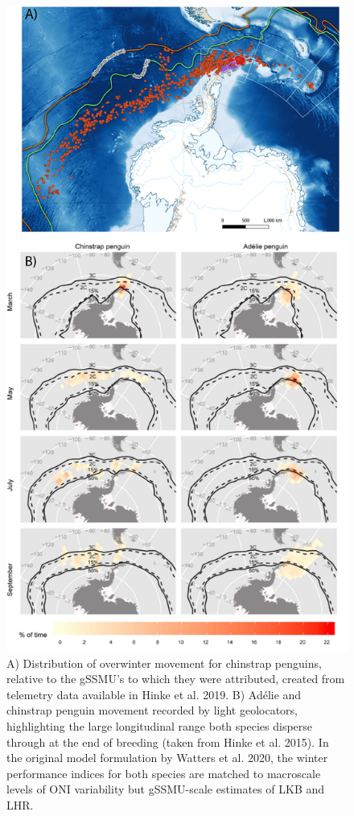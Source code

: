 \documentclass[]{elsarticle} %
\begin{document}
\begin{figure}
\includegraphics[width=0.75\linewidth]{./Watters EMM figures/Overwinter pengo distributions} \caption{A) Distribution of overwinter movement for chinstrap penguins, relative to the gSSMU's to which they were attributed, created from telemetry data available in Hinke et al. 2019.  B) Adélie and chinstrap penguin movement recorded by light geolocators, highlighting the large longitudinal range both species disperse through at the end of breeding (taken from Hinke et al. 2015).  In the original model formulation by Watters et al. 2020, the winter performance indices for both species are matched to macroscale levels of ONI variability but gSSMU-scale estimates of LKB and LHR.}\label{fig:Overwinter penguin  plots}
\end{figure}
\end{document}
